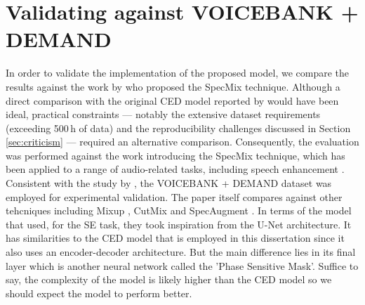 \documentclass[logo,bsc,singlespacing,parskip,online]{infthesis}
\begin{document}
\section{Validating against VOICEBANK + DEMAND}
In order to validate the implementation of the proposed model, we compare the results 
against the work by \citet{kim_specmix_2021} who proposed the SpecMix technique. 
Although a direct comparison with the original CED model reported by \citet{tan18_interspeech} 
would have been ideal, practical constraints — notably the extensive dataset requirements 
(exceeding 500\,h of data) and the reproducibility challenges discussed in Section \ref{sec:criticism} — 
required an alternative comparison. Consequently, the evaluation was performed against the work 
introducing the SpecMix technique, which has been applied to a range of audio-related 
tasks, including speech enhancement \citep{kim_specmix_2021}. Consistent with the study 
by \citet{kim_specmix_2021}, the VOICEBANK + DEMAND dataset was employed for experimental 
validation. The paper itself compares against other tehcniques including Mixup \citep{zhang_mixup_2017},
CutMix \citep{yun_cutmix_2019} and SpecAugment \citep{park_specaugment_2019}. In terms 
of the model that \citet{kim_specmix_2021} used, for the SE task, they 
took inspiration from the U-Net \citep{ronneberger_unet_2015} architecture.
It has similarities to the CED model that is employed in this dissertation 
since it also uses an encoder-decoder architecture. But the main difference 
lies in its final layer which is another neural network called the 
'Phase Sensitive Mask'. Suffice to say, the complexity of the model 
is likely higher than the CED model so we should expect the model 
to perform better.
\end{document}
